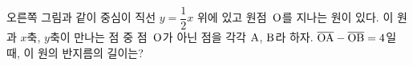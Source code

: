\noindent\begin{minipage}[t]{0.58\linewidth}\vspace{0pt}\raggedright 오른쪽 그림과 같이 중심이 직선 $y=\dfrac{1}{2}x$ 위에 있고 원점~$\mathrm{O}$를 지나는 원이 있다. 이 원과 $x$축, $y$축이 만나는 점 중 점~$\mathrm{O}$가 아닌 점을 각각 $\mathrm{A}$, $\mathrm{B}$라 하자. $\overline{\mathrm{OA}}-\overline{\mathrm{OB}}=4$일 때, 이 원의 반지름의 길이는? \end{minipage}\hfill\begin{minipage}[t]{0.4\linewidth}\vspace{0pt}\centering \resizebox{\ifdim\width>\linewidth\linewidth\else\width\fi}{!}{}\end{minipage}\par
{}
